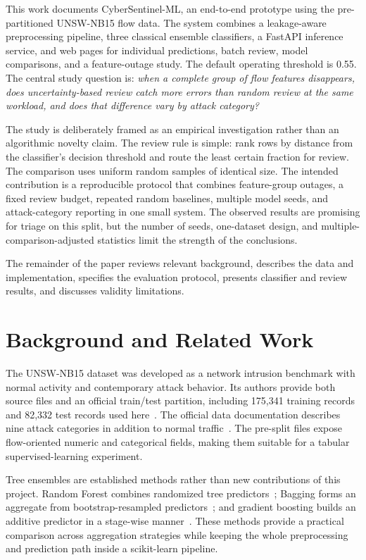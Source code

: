 \documentclass[conference]{IEEEtran}
\begin{document}
This work documents CyberSentinel-ML, an end-to-end prototype using the pre-partitioned UNSW-NB15 flow data. The system combines a leakage-aware preprocessing pipeline, three classical ensemble classifiers, a FastAPI inference service, and web pages for individual predictions, batch review, model comparisons, and a feature-outage study. The default operating threshold is 0.55. The central study question is: \emph{when a complete group of flow features disappears, does uncertainty-based review catch more errors than random review at the same workload, and does that difference vary by attack category?}

The study is deliberately framed as an empirical investigation rather than an algorithmic novelty claim. The review rule is simple: rank rows by distance from the classifier's decision threshold and route the least certain fraction for review. The comparison uses uniform random samples of identical size. The intended contribution is a reproducible protocol that combines feature-group outages, a fixed review budget, repeated random baselines, multiple model seeds, and attack-category reporting in one small system. The observed results are promising for triage on this split, but the number of seeds, one-dataset design, and multiple-comparison-adjusted statistics limit the strength of the conclusions.

The remainder of the paper reviews relevant background, describes the data and implementation, specifies the evaluation protocol, presents classifier and review results, and discusses validity limitations.

\section{Background and Related Work}
The UNSW-NB15 dataset was developed as a network intrusion benchmark with normal activity and contemporary attack behavior. Its authors provide both source files and an official train/test partition, including 175,341 training records and 82,332 test records used here~\cite{moustafa2015}. The official data documentation describes nine attack categories in addition to normal traffic~\cite{unswsite}. The pre-split files expose flow-oriented numeric and categorical fields, making them suitable for a tabular supervised-learning experiment.

Tree ensembles are established methods rather than new contributions of this project. Random Forest combines randomized tree predictors~\cite{breiman2001}; Bagging forms an aggregate from bootstrap-resampled predictors~\cite{breiman1996}; and gradient boosting builds an additive predictor in a stage-wise manner~\cite{friedman2001}. These methods provide a practical comparison across aggregation strategies while keeping the whole preprocessing and prediction path inside a scikit-learn pipeline.
\end{document}
